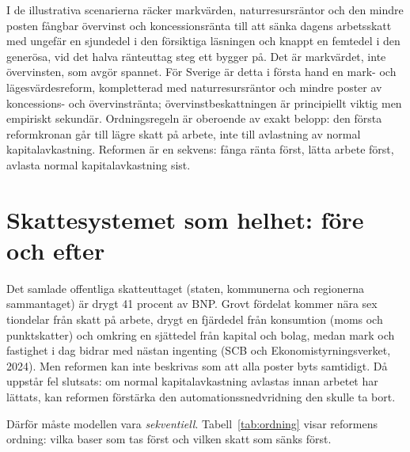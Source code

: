\documentclass[11pt]{article}
\begin{document}
I de illustrativa scenarierna räcker markvärden, naturresursräntor och den mindre posten fångbar övervinst och koncessionsränta till att sänka dagens arbetsskatt med ungefär en sjundedel i den försiktiga läsningen och knappt en femtedel i den generösa, vid det halva ränteuttag steg ett bygger på. Det är markvärdet, inte övervinsten, som avgör spannet. För Sverige är detta i första hand en mark- och lägesvärdesreform, kompletterad med naturresursräntor och mindre poster av koncessions- och övervinstränta; övervinstbeskattningen är principiellt viktig men empiriskt sekundär. Ordningsregeln är oberoende av exakt belopp: den första reformkronan går till lägre skatt på arbete, inte till avlastning av normal kapitalavkastning. Reformen är en sekvens: fånga ränta först, lätta arbete först, avlasta normal kapitalavkastning sist.


\section{Skattesystemet som helhet: före och efter}

Det samlade offentliga skatteuttaget (staten, kommunerna och regionerna sammantaget) är drygt 41 procent av BNP. Grovt fördelat kommer nära sex tiondelar från skatt på arbete, drygt en fjärdedel från konsumtion (moms och punktskatter) och omkring en sjättedel från kapital och bolag, medan mark och fastighet i dag bidrar med nästan ingenting (SCB och Ekonomistyrningsverket, 2024). Men reformen kan inte beskrivas som att alla poster byts samtidigt. Då uppstår fel slutsats: om normal kapitalavkastning avlastas innan arbetet har lättats, kan reformen förstärka den automationssnedvridning den skulle ta bort.

Därför måste modellen vara \emph{sekventiell}. Tabell~\ref{tab:ordning} visar reformens ordning: vilka baser som tas först och vilken skatt som sänks först.
\end{document}
